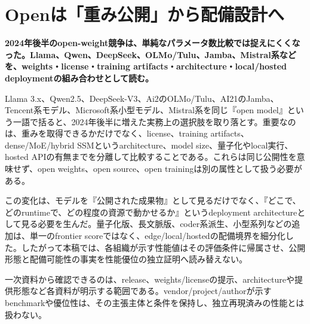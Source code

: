 \section{Openは「重み公開」から配備設計へ}
\label{pkg:open-deployment}
\noindent\textbf{2024年後半のopen-weight競争は、単純なパラメータ数比較では捉えにくくなった。Llama、Qwen、DeepSeek、OLMo/Tulu、Jamba、Mistral系などを、weights・license・training artifacts・architecture・local/hosted deploymentの組み合わせとして読む。}\autocite{src-042479f9308f,src-8f8555b73e1b,src-e8f0a037900e}

Llama 3.x、Qwen2.5、DeepSeek-V3、Ai2のOLMo/Tulu、AI21のJamba、Tencent系モデル、Microsoft系小型モデル、Mistral系を同じ『open model』という一語で括ると、2024年後半に増えた実務上の選択肢を取り落とす。重要なのは、重みを取得できるかだけでなく、license、training artifacts、dense/MoE/hybrid SSMというarchitecture、model size、量子化やlocal実行、hosted APIの有無までを分離して比較することである。これらは同じ公開性を意味せず、open weights、open source、open trainingは別の属性として扱う必要がある。\autocite{src-042479f9308f,src-16b95c7a8737,src-24aefc391976,src-5b3150b68247,src-7882832e3ea8,src-8f8555b73e1b,src-9d854c1d7239,src-ae11d62632e2,src-dabb3f4afb75,src-e40065b96e7c,src-e8f0a037900e}


この変化は、モデルを『公開された成果物』として見るだけでなく、『どこで、どのruntimeで、どの程度の資源で動かせるか』というdeployment architectureとして見る必要を生んだ。量子化版、長文脈版、coder系派生、小型系列などの追加は、単一のfrontier scoreではなく、edge/local/hostedの配備境界を細分化した。したがって本稿では、各組織が示す性能値はその評価条件に帰属させ、公開形態と配備可能性の事実を性能優位の独立証明へ読み替えない。\autocite{src-22a7228f1409,src-bcbc025369e3,src-ecac5d71389f,src-ee43656ed6da}


\begin{claimboundary}
一次資料から確認できるのは、release、weights/licenseの提示、architectureや提供形態など各資料が明示する範囲である。vendor/project/authorが示すbenchmarkや優位性は、その主張主体と条件を保持し、独立再現済みの性能とは扱わない。\autocite{src-8f8555b73e1b}
\end{claimboundary}

